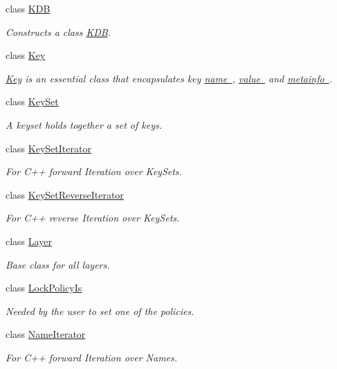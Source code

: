 \begin{DoxyCompactItemize}
class \mbox{\hyperlink{classkdb_1_1KDB}{K\+DB}}
\begin{DoxyCompactList}\small\item\em Constructs a class \mbox{\hyperlink{classkdb_1_1KDB}{K\+DB}}. \end{DoxyCompactList}\item 
class \mbox{\hyperlink{classkdb_1_1Key}{Key}}
\begin{DoxyCompactList}\small\item\em \mbox{\hyperlink{classkdb_1_1Key}{Key}} is an essential class that encapsulates key \mbox{\hyperlink{group__keyname}{name }}, \mbox{\hyperlink{group__keyvalue}{value }} and \mbox{\hyperlink{group__keymeta}{metainfo }}. \end{DoxyCompactList}\item 
class \mbox{\hyperlink{classkdb_1_1KeySet}{Key\+Set}}
\begin{DoxyCompactList}\small\item\em A keyset holds together a set of keys. \end{DoxyCompactList}\item 
class \mbox{\hyperlink{classkdb_1_1KeySetIterator}{Key\+Set\+Iterator}}
\begin{DoxyCompactList}\small\item\em For C++ forward Iteration over Key\+Sets. \end{DoxyCompactList}\item 
class \mbox{\hyperlink{classkdb_1_1KeySetReverseIterator}{Key\+Set\+Reverse\+Iterator}}
\begin{DoxyCompactList}\small\item\em For C++ reverse Iteration over Key\+Sets. \end{DoxyCompactList}\item 
class \mbox{\hyperlink{classkdb_1_1Layer}{Layer}}
\begin{DoxyCompactList}\small\item\em Base class for all layers. \end{DoxyCompactList}\item 
class \mbox{\hyperlink{classkdb_1_1LockPolicyIs}{Lock\+Policy\+Is}}
\begin{DoxyCompactList}\small\item\em Needed by the user to set one of the policies. \end{DoxyCompactList}\item 
class \mbox{\hyperlink{classkdb_1_1NameIterator}{Name\+Iterator}}
\begin{DoxyCompactList}\small\item\em For C++ forward Iteration over Names. \end{DoxyCompactList}\item 

\end{DoxyCompactItemize}
